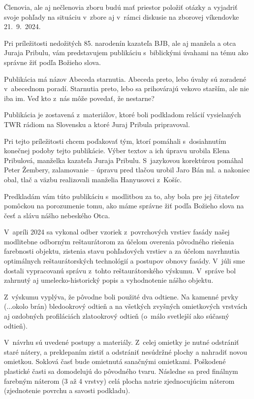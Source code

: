 Členovia, ale aj nečlenovia zboru budú mať priestor položiť otázky a vyjadriť svoje pohľady na situáciu v~zbore aj v~rámci diskusie na zborovej víkendovke 21.~9.~2024.




Pri príležitosti nedožitých 85. narodenín kazateľa BJB, ale aj manžela a otca Juraja Pribulu, vám predstavujem publikáciu s~biblickými úvahami na tému ako správne žiť podľa Božieho slova.

Publikácia má názov Abeceda starnutia. Abeceda preto, lebo úvahy sú zoradené v~abecednom poradí. Starnutia preto, lebo sa prihovárajú vekovo starším, ale nie iba im. Veď kto z~nás môže povedať, že nestarne?  

Publikácia je zostavená z~materiálov, ktoré boli podkladom relácií vysielaných TWR rádiom na Slovensku a ktoré Juraj Pribula pripravoval.

Pri tejto príležitosti chcem poďakovať tým, ktorí pomáhali s~dosiahnutím konečnej podoby tejto publikácie. Výber textov a ich úpravu urobila Elena Pribulová, manželka kazateľa Juraja Pribulu. S~jazykovou korektúrou pomáhal Peter Žembery, zalamovanie – úpravu pred tlačou urobil Jaro Bán ml. a nakoniec obal, tlač a väzbu realizovali manželia Hanyusovci z~Košíc.

Predkladám vám túto publikáciu s~modlitbou za to, aby bola pre jej čitateľov pomôckou na porozumenie tomu, ako máme správne žiť podľa Božieho slova na česť a slávu nášho nebeského Otca.




V~apríli 2024 sa vykonal odber vzoriek z~povrchových vrstiev fasády našej modlitebne odborným reštaurátorom za účelom overenia pôvodného riešenia farebnosti objektu, zistenia stavu pohľadových vrstiev a za účelom navrhnutia optimálnych reštaurátorských technológií a postupov obnovy fasády. V~júli sme dostali vypracovanú správu z~tohto reštaurátorského výskumu. V~správe bol zahrnutý aj umelecko-historický popis a vyhodnotenie nášho objektu.

Z~výskumu vyplýva, že pôvodne boli použité dva odtiene. Na kamenné prvky (...okolo brán) bledookrový odtieň a na všetkých zvyšných omietkových vrstvách aj ozdobných profiláciách zlatookrový odtieň (o~málo svetlejší ako súčasný odtieň).

V~návrhu sú uvedené postupy a materiály. Z~celej omietky je nutné odstrániť staré nátery, a preklepaním zistiť a odstrániť nesúdržné plochy a nahradiť novou omietkou. Soklová časť bude omietnutá sanačnými omietkami. Poškodené plastické časti sa domodelujú do pôvodného tvaru. Následne sa pred finálnym farebným náterom (3 až 4 vrstvy) celá plocha natrie zjednocujúcim náterom (zjednotenie povrchu a savosti podkladu).

